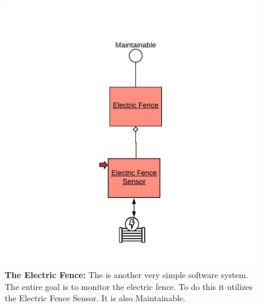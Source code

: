 \documentclass[12pt]{article}
\begin{document}
\begin{figure}[H]
    \centerline{\includegraphics[scale=.20]{ElectricFence.png}}
    \caption{\textbf{The Electric Fence: }The is another very simple software system. The entire goal is to monitor the 
electric fence. To do this it utilizes the Electric Fence Sensor. It is also Maintainable.}
    \label{fig:ElectricFence}
\end{figure}   
\end{document}
